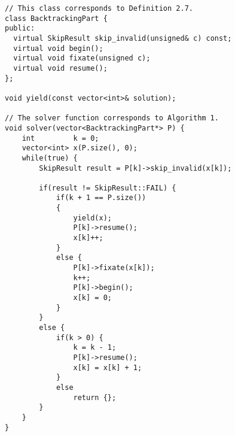 \begin{lstlisting}[language=MyCpp,
                   label={cppsolver},caption=
  {Complete C++ implementation of \Cref{backtrackalg}:
    The if-else statements in lines 19--41 precisely correspond to those
    in lines 5--17 of that algorithm.
    The \texttt{BacktrackingPart} objects iterate over $\protect{B_k[C](M,x)}$ via the
    \texttt{skip\_invalid} method.
    The remaining member function calls in lines
    $\text{23},\text{27},\text{29},\text{36}$ precompute structures that are
    used in \texttt{skip\_invalid} for quick evaluation.}]
// This class corresponds to Definition 2.7.
class BacktrackingPart {
public:
  virtual SkipResult skip_invalid(unsigned& c) const;
  virtual void begin();
  virtual void fixate(unsigned c);
  virtual void resume();
};

void yield(const vector<int>& solution);

// The solver function corresponds to Algorithm 1.
void solver(vector<BacktrackingPart*> P) {
    int         k = 0;
    vector<int> x(P.size(), 0);
    while(true) {
        SkipResult result = P[k]->skip_invalid(x[k]);

        if(result != SkipResult::FAIL) {
            if(k + 1 == P.size())
            {
                yield(x);
                P[k]->resume();
                x[k]++;
            }
            else {
                P[k]->fixate(x[k]);
                k++;
                P[k]->begin();
                x[k] = 0;
            }
        }
        else {
            if(k > 0) {
                k = k - 1;
                P[k]->resume();
                x[k] = x[k] + 1;
            }
            else
                return {};
        }
    }
}
\end{lstlisting}
